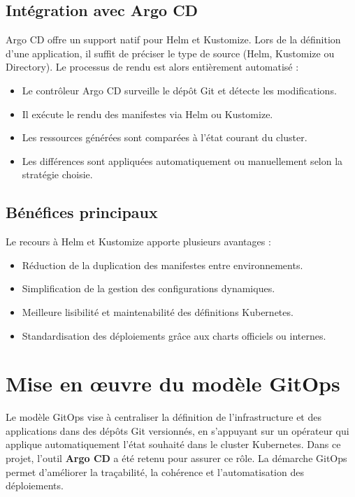 \subsection{Intégration avec Argo CD}

Argo CD offre un support natif pour Helm et Kustomize. Lors de la définition d’une application, il suffit de préciser le type de source (Helm, Kustomize ou Directory). Le processus de rendu est alors entièrement automatisé :
\begin{itemize}
	\item Le contrôleur Argo CD surveille le dépôt Git et détecte les modifications.
	\item Il exécute le rendu des manifestes via Helm ou Kustomize.
	\item Les ressources générées sont comparées à l’état courant du cluster.
	\item Les différences sont appliquées automatiquement ou manuellement selon la stratégie choisie.
\end{itemize}

\subsection{Bénéfices principaux}

Le recours à Helm et Kustomize apporte plusieurs avantages :
\begin{itemize}
	\item Réduction de la duplication des manifestes entre environnements.
	\item Simplification de la gestion des configurations dynamiques.
	\item Meilleure lisibilité et maintenabilité des définitions Kubernetes.
	\item Standardisation des déploiements grâce aux charts officiels ou internes.
\end{itemize}

\section{Mise en œuvre du modèle GitOps}

Le modèle GitOps vise à centraliser la définition de l’infrastructure et des applications dans des dépôts Git versionnés, en s’appuyant sur un opérateur qui applique automatiquement l’état souhaité dans le cluster Kubernetes.
Dans ce projet, l’outil \textbf{Argo CD} a été retenu pour assurer ce rôle.
La démarche GitOps permet d’améliorer la traçabilité, la cohérence et l’automatisation des déploiements.

